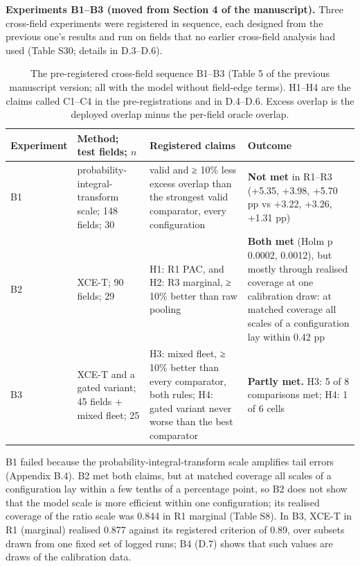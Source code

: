 \documentclass[preprint,12pt,authoryear]{elsarticle}
\begin{document}
\textbf{Experiments B1--B3 (moved from Section 4 of the manuscript).} Three cross-field experiments were registered in sequence, each designed from the previous one's results and run on fields that no earlier cross-field analysis had used (Table S30; details in D.3--D.6).

\begin{table}[!htbp]
\centering
\footnotesize
\renewcommand{\thetable}{S30}\caption{The pre-registered cross-field sequence B1--B3 (Table 5 of the previous manuscript version; all with the model without field-edge terms). H1--H4 are the claims called C1--C4 in the pre-registrations and in D.4--D.6. Excess overlap is the deployed overlap minus the per-field oracle overlap.}
\begin{tabularx}{\textwidth}{@{}l>{\raggedright\arraybackslash\hsize=1.00\hsize}X>{\raggedright\arraybackslash\hsize=1.00\hsize}X>{\raggedright\arraybackslash\hsize=1.00\hsize}X@{}}
\toprule
\textbf{Experiment} & \textbf{Method; test fields; \(n\)} & \textbf{Registered claims} & \textbf{Outcome} \\
\midrule
B1 & probability-integral-transform scale; 148 fields; 30 & valid and ≥ 10\% less excess overlap than the strongest valid comparator, every configuration & \textbf{Not met} in R1--R3 (+5.35, +3.98, +5.70 pp vs +3.22, +3.26, +1.31 pp) \\
B2 & XCE-T; 90 fields; 29 & H1: R1 PAC, and H2: R3 marginal, ≥ 10\% better than raw pooling & \textbf{Both met} (Holm p 0.0002, 0.0012), but mostly through realised coverage at one calibration draw: at matched coverage all scales of a configuration lay within 0.42 pp \\
B3 & XCE-T and a gated variant; 45 fields + mixed fleet; 25 & H3: mixed fleet, ≥ 10\% better than every comparator, both rules; H4: gated variant never worse than the best comparator & \textbf{Partly met.} H3: 5 of 8 comparisons met; H4: 1 of 6 cells \\
\bottomrule
\end{tabularx}
\end{table}

B1 failed because the probability-integral-transform scale amplifies tail errors (Appendix B.4). B2 met both claims, but at matched coverage all scales of a configuration lay within a few tenths of a percentage point, so B2 does not show that the model scale is more efficient within one configuration; its realised coverage of the ratio scale was 0.844 in R1 marginal (Table S8). In B3, XCE-T in R1 (marginal) realised 0.877 against its registered criterion of 0.89, over subsets drawn from one fixed set of logged runs; B4 (D.7) shows that such values are draws of the calibration data.
\end{document}
